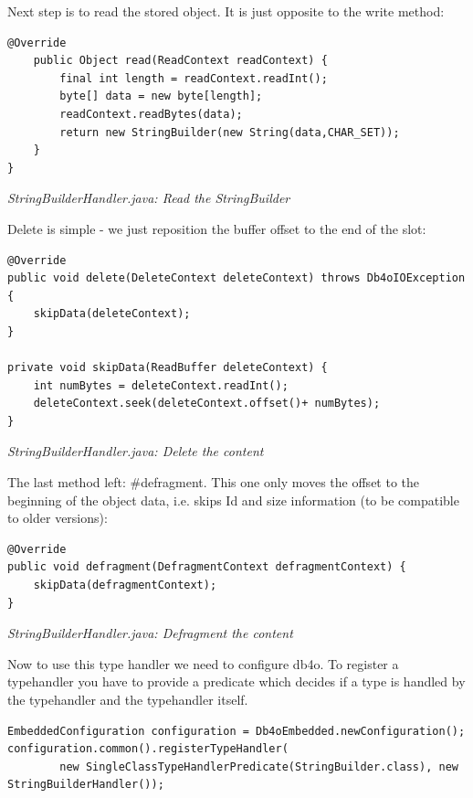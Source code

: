Next step is to read the stored object. It is just opposite to the write method:

\begin{lstlisting}
@Override
    public Object read(ReadContext readContext) {
        final int length = readContext.readInt();
        byte[] data = new byte[length];
        readContext.readBytes(data);
        return new StringBuilder(new String(data,CHAR_SET));
    }
}
\end{lstlisting}

{\small\itshape StringBuilderHandler.java: Read the StringBuilder\par}
\medskip

Delete is simple - we just reposition the buffer offset to the end of the slot:

\begin{lstlisting}
@Override
public void delete(DeleteContext deleteContext) throws Db4oIOException {
    skipData(deleteContext);
}

private void skipData(ReadBuffer deleteContext) {
    int numBytes = deleteContext.readInt();
    deleteContext.seek(deleteContext.offset()+ numBytes);
}
\end{lstlisting}

{\small\itshape StringBuilderHandler.java: Delete the content\par}
\medskip

The last method left: \#defragment. This one only moves the offset to the beginning of the object data, i.e. skips Id and size information (to be compatible to older versions):

\begin{lstlisting}
@Override
public void defragment(DefragmentContext defragmentContext) {
    skipData(defragmentContext);
}
\end{lstlisting}

{\small\itshape StringBuilderHandler.java: Defragment the content\par}
\medskip

Now to use this type handler we need to configure db4o. To register a typehandler you have to provide a predicate which decides if a type is handled by the typehandler and the typehandler itself.

\begin{lstlisting}
EmbeddedConfiguration configuration = Db4oEmbedded.newConfiguration();
configuration.common().registerTypeHandler(
        new SingleClassTypeHandlerPredicate(StringBuilder.class), new StringBuilderHandler());
\end{lstlisting}

